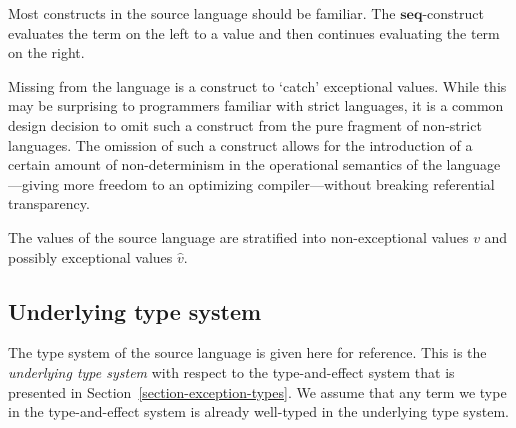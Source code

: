 \documentclass{llncs}
\newcommand{\Val}{v}
\newcommand{\ExnVal}{\widehat{v}}
\begin{document}
Most constructs in the source language should be familiar. The $\mathbf{seq}$-construct evaluates the term on the left to a value and then continues evaluating the term on the right.

Missing from the language is a construct to `catch' exceptional values. While this may be surprising to programmers familiar with strict languages, it is a common design decision to omit such a construct from the pure fragment of non-strict languages. The omission of such a construct allows for the introduction of a certain amount of non-determinism in the operational semantics of the language---giving more freedom to an optimizing compiler---without breaking referential transparency.

The values of the source language are stratified into non-exceptional values $\Val$ and possibly exceptional values $\ExnVal$.

\subsection{Underlying type system}

The type system of the source language is given here for reference. This is the \emph{underlying type system} with respect to the type-and-effect system that is presented in Section~\ref{section-exception-types}. We assume that any term we type in the type-and-effect system is already well-typed in the underlying type system.
\end{document}
